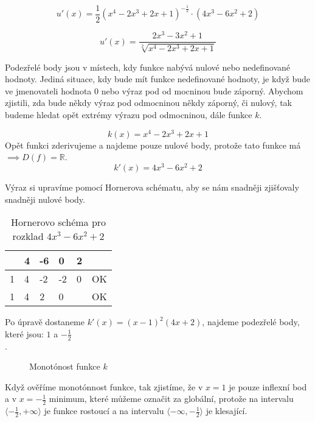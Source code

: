 \begin{displaymath}
u'(x)=\frac{1}{2}(x^4 -2x^3 + 2x + 1)^{-\frac{1}{2}}\cdot(4x^3 - 6x^2 + 2)
\end{displaymath}

\begin{displaymath}
u'(x)=\frac{2x^3 - 3x^2 + 1}{\sqrt[2]{x^4 -2x^3 + 2x + 1}}
\end{displaymath}

Podezřelé body jsou v místech, kdy funkce nabývá nulové nebo nedefinované hodnoty. 
Jediná situace, kdy bude mít funkce nedefinované hodnoty, je když bude ve jmenovateli hodnota 0 nebo výraz pod od mocninou bude záporný.
Abychom zjistili, zda bude někdy výraz pod odmocninou někdy záporný, či nulový, tak budeme hledat opět extrémy výrazu pod odmocninou, dále funkce \(k\).

\begin{displaymath}
k(x)=x^4 -2x^3 + 2x + 1
\end{displaymath}
Opět funkci zderivujeme a najdeme pouze nulové body, protože tato funkce má \(\implies D(f) = \mathbb{R}\).
\begin{displaymath}
k'(x)=4x^3 -6x^2 + 2
\end{displaymath}

Výraz si upravíme pomocí Hornerova schématu, aby se nám snadněji zjišťovaly snadněji nulové body.
\begin{table}[!h]
\centering
\begin{tabular}{l||l|l|l|l|l}
	 & 4 & -6 &  0 & 2 &    \\ \hline\hline
   1 & 4 & -2 & -2 & 0 & OK \\ \hline
   1 & 4 &  2 &  0 &   & OK \\
\end{tabular}
\caption{Hornerovo schéma pro rozklad $4x^3 - 6x^2 + 2$}
\end{table}

Po úpravě dostaneme \(k'(x)=(x-1)^2(4x + 2)\), najdeme podezřelé body, které jsou: $1$ a $-\frac{1}{2}$\\.

\begin{figure}[H]
	\centering
	
	\caption{Monotónost funkce \(k\)}
\end{figure}

Když ověříme monotónnost funkce, tak zjistíme, že v $x=1$ je pouze inflexní bod a v $x=-\frac{1}{2}$ minimum, 
které můžeme označit za globální, protože na intervalu \(\langle-\frac{1}{2},+\infty\rangle\) je funkce rostoucí 
a na intervalu \(\langle-\infty,-\frac{1}{2}\rangle\) je klesající.

